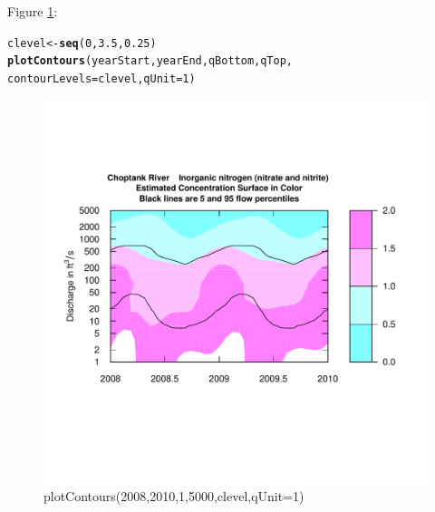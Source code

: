 \documentclass[a4paper,11pt]{article}\usepackage{graphicx, color}
\makeatletter
\newcommand{\hlfunctioncall}[1]{\textcolor[rgb]{0.501960784313725,0,0.329411764705882}{\textbf{#1}}}%
\newenvironment{kframe}{%
 \def\at@end@of@kframe{}%
 \ifinner\ifhmode%
  \def\at@end@of@kframe{\end{minipage}}%
  \begin{minipage}{\columnwidth}%
 \fi\fi%
 \def\FrameCommand##1{\hskip\@totalleftmargin \hskip-\fboxsep
 \colorbox{shadecolor}{##1}\hskip-\fboxsep
     \hskip-\linewidth \hskip-\@totalleftmargin \hskip\columnwidth}%
 \MakeFramed {\advance\hsize-\width
   \@totalleftmargin\z@ \linewidth\hsize
   \@setminipage}}%
 {\par\unskip\endMakeFramed%
 \at@end@of@kframe}
\newenvironment{knitrout}{}{} %
\makeatother
\begin{document}
Figure \ref{fig:plotContours}:
\begin{knitrout}
\color{fgcolor}\begin{kframe}
\begin{alltt}
clevel<-\hlfunctioncall{seq}(0,3.5,0.25)
\hlfunctioncall{plotContours}(yearStart,yearEnd,qBottom,qTop, 
             contourLevels = clevel,qUnit=1)
\end{alltt}
\end{kframe}\begin{figure}[]

\includegraphics[width=1\linewidth,height=1\linewidth]{figure/plotContours} \caption[plotContours(2008,2010,1,5000,clevel,qUnit=1)]{plotContours(2008,2010,1,5000,clevel,qUnit=1)\label{fig:plotContours}}
\end{figure}


\end{knitrout}
\end{document}

